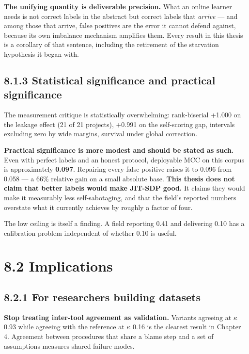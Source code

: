 \textbf{The unifying quantity is deliverable precision.} What an online
learner needs is not correct labels in the abstract but correct labels
that \emph{arrive} --- and among those that arrive, false positives are
the error it cannot defend against, because its own imbalance mechanism
amplifies them. Every result in this thesis is a corollary of that
sentence, including the retirement of the starvation hypothesis it began
with.

\subsection{8.1.3 Statistical significance and practical
significance}\label{statistical-significance-and-practical-significance}

The measurement critique is statistically overwhelming: rank-biserial
+1.000 on the leakage effect (21 of 21 projects), +0.991 on the
self-scoring gap, intervals excluding zero by wide margins, survival
under global correction.

\textbf{Practical significance is more modest and should be stated as
such.} Even with perfect labels and an honest protocol, deployable MCC
on this corpus is approximately \textbf{0.097}. Repairing every false
positive raises it to 0.096 from 0.058 --- a 66\% relative gain on a
small absolute base. \textbf{This thesis does not claim that better
labels would make JIT-SDP good.} It claims they would make it measurably
less self-sabotaging, and that the field's reported numbers overstate
what it currently achieves by roughly a factor of four.

The low ceiling is itself a finding. A field reporting 0.41 and
delivering 0.10 has a calibration problem independent of whether 0.10 is
useful.

\section{8.2 Implications}\label{implications}

\subsection{8.2.1 For researchers building
datasets}\label{for-researchers-building-datasets}

\textbf{Stop treating inter-tool agreement as validation.} Variants
agreeing at \ensuremath{\kappa} 0.93 while agreeing with the reference at \ensuremath{\kappa} 0.16 is the
clearest result in Chapter 4. Agreement between procedures that share a
blame step and a set of assumptions measures shared failure modes.

